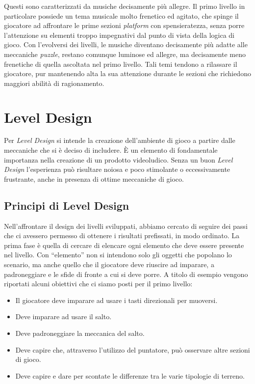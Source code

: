 Questi sono caratterizzati da musiche decisamente più allegre. Il primo livello in particolare possiede un tema musicale molto frenetico ed agitato, che spinge il giocatore ad affrontare le prime sezioni \textit{platform} con spensieratezza, senza porre l’attenzione su elementi troppo impegnativi dal punto di vista della logica di gioco.
Con l’evolversi dei livelli, le musiche diventano decisamente più adatte alle meccaniche \textit{puzzle}, restano comunque luminose ed allegre, ma decisamente meno frenetiche di quella ascoltata nel primo livello. Tali temi tendono a rilassare il giocatore, pur mantenendo alta la sua attenzione durante le sezioni che richiedono maggiori abilità di ragionamento.

\section{Level Design}
\label{sec:level_design}

Per \textit{Level Design} si intende la creazione dell’ambiente di gioco a partire dalle meccaniche che si è deciso di includere. È un elemento di fondamentale importanza nella creazione di un prodotto videoludico. Senza un buon \textit{Level Design} l’esperienza può risultare noiosa e poco stimolante o eccessivamente frustrante, anche in presenza di ottime meccaniche di gioco.

\subsection{Principi di Level Design}
\label{sec:principi_level_design}

Nell’affrontare il design dei livelli sviluppati, abbiamo cercato di seguire dei passi che ci avessero permesso di ottenere i risultati prefissati, in modo ordinato.
La prima fase è quella di cercare di elencare ogni elemento che deve essere presente nel livello. Con “elemento” non si intendono solo gli oggetti che popolano lo scenario, ma anche quello che il giocatore deve riuscire ad imparare, a padroneggiare e le sfide di fronte a cui si deve porre. A titolo di esempio vengono riportati alcuni obiettivi che ci siamo posti per il primo livello:

\begin{itemize}
	\item Il giocatore deve imparare ad usare i tasti direzionali per muoversi.
	\item Deve imparare ad usare il salto.
	\item Deve padroneggiare la meccanica del salto.
	\item Deve capire che, attraverso l’utilizzo del puntatore, può osservare altre sezioni di gioco.
	\item Deve capire e dare per scontate le differenze tra le varie tipologie di terreno.
\end{itemize}

